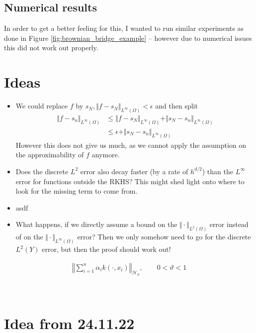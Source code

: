\documentclass[a4paper, 10pt]{article}
\newcommand{\Ht}{\mathcal{H}_{\vartheta}}
\begin{document}
\subsection{Numerical results}

In order to get a better feeling for this, I wanted to run similar experiments as done in Figure \ref{fig:brownian_bridge_example} -- however due to numerical issues this did not work out properly.




\section{Ideas}

\begin{itemize}
\item We could replace $f$ by $s_N, \Vert f - s_N \Vert_{L^\infty(\Omega)} < \epsilon$ and then split
\begin{align*}
\Vert f - s_n \Vert_{L^\infty(\Omega)} &\leq \Vert f - s_N \Vert_{L^\infty(\Omega)} + \Vert s_N - s_n \Vert_{L^\infty(\Omega)} \\
&\leq \epsilon + \Vert s_N - s_n \Vert_{L^\infty(\Omega)} 
\end{align*}
However this does not give us much, as we cannot apply the assumption on the approximability of $f$ anymore.
\item Does the discrete $L^2$ error also decay faster (by a rate of $h^{d/2}$) than the $L^\infty$ error for functions outside the RKHS?
This might shed light onto where to look for the missing term to come from.
\item asdf
\item What happens, if we directly assume a bound on the $\Vert \cdot \Vert_{L^2(\Omega)}$ error instead of on the $\Vert \cdot \Vert_{L^\infty(\Omega)}$ error?
Then we only somehow need to go for the discrete $L^2(Y)$ error, but then the proof should work out!
\end{itemize}

\begin{align*}
\left \Vert \sum_{i=1}^n \alpha_i k(\cdot, x_i) \right \Vert_{\Ht}, \qquad 0 < \vartheta < 1
\end{align*}

~ \newpage 

\section{Idea from 24.11.22}
\end{document}
